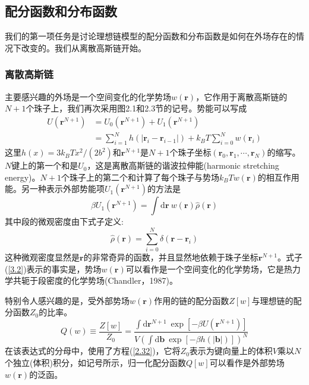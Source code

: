 \subsection{配分函数和分布函数}
我们的第一项任务是讨论理想链模型的配分函数和分布函数是如何在外场存在的情况下改变的。我们从离散高斯链开始。
\subsubsection{离散高斯链}
主要感兴趣的外场是一个空间变化的化学势场$w(\mathbf{r})$，它作用于离散高斯链的$N+1$个珠子上，我们再次采用图2.1和2.3节的记号。势能可以写成
\begin{equation}\label{3.1}
\begin{aligned}
U(\mathbf{r}^{N+1})&=U_0(\mathbf{r}^{N+1})+U_1(\mathbf{r}^{N+1})\\
&=\sum\limits_{i=1}^Nh(\left|\mathbf{r}_i-\mathbf{r}_{i-1}\right|)+k_BT\sum\limits_{i=0}^Nw(\mathbf{r}_i)
\end{aligned}
\end{equation}
这里$h(x)=3k_BTx^2/(2b^2)$和$\mathbf{r}^{N+1}$是$N+1$个珠子坐标$(\mathbf{r}_0,\mathbf{r}_1,\cdots,\mathbf{r}_N)$的缩写。$N$键上的第一个和是$U_0$，这是离散高斯链的谐波拉伸能(harmonic stretching energy)。$N+1$个珠子上的第二个和计算了每个珠子与势场$k_BTw(\mathbf{r})$的相互作用能。另一种表示外部势能项$U_1(\mathbf{r}^{N+1})$的方法是
\begin{equation}\label{3.2}
\beta U_1(\mathbf{r}^{N+1})=\int\mathrm{d}\mathbf{r}~w(\mathbf{r})\hat{\rho}(\mathbf{r})
\end{equation}
其中段的微观密度由下式子定义:
\begin{equation}\label{3.3}
\hat{\rho}(\mathbf{r})=\sum\limits_{i=0}^N\delta(\mathbf{r}-\mathbf{r}_i)
\end{equation}
这种微观密度显然是$\mathbf{r}$的非常奇异的函数，并且显然地依赖于珠子坐标$\mathbf{r}^{N+1}$。式子(\ref{3.2})表示的事实是，势场$w(\mathbf{r})$可以看作是一个空间变化的化学势场，它是热力学共轭于段密度的化学势场(Chandler，1987)。

特别令人感兴趣的是，受外部势场$w(\mathbf{r})$作用的链的配分函数$Z[w]$与理想链的配分函数$Z_0$的比率。
\begin{equation}\label{3.4}
Q(w)\equiv\frac{Z[w]}{Z_0}=\frac{\int\mathrm{d}\mathbf{r}^{N+1}~\exp[-\beta U(\mathbf{r}^{N+1})]}{V(\int\mathrm{d}\mathbf{b}~\exp[-\beta h(\left|\mathbf{b}\right|)])^N}
\end{equation}
在该表达式的分母中，使用了方程(\ref{2.32})，它将$Z_0$表示为键向量上的体积$V$乘以$N$个独立(体积)积分，如记号所示，归一化配分函数$Q[w]$可以看作是外部势场$w(\mathbf{r})$的泛函。

